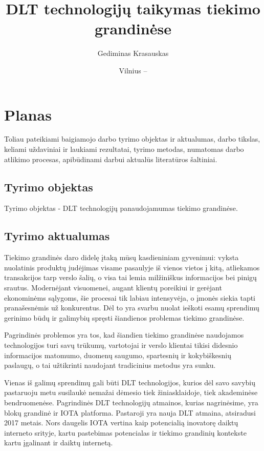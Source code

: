 \documentclass{VUMIFPSkursinis}
\title{DLT technologijų taikymas tiekimo grandinėse}
\author{Gediminas Krasauskas}
\date{Vilnius – \the\year}
\begin{document}
\maketitle

\section{Planas}

Toliau pateikiami baigiamojo darbo tyrimo objektas ir aktualumas, darbo tikslas, keliami uždaviniai ir laukiami rezultatai, tyrimo metodas, numatomas darbo atlikimo procesas, apibūdinami darbui aktualūs literatūros šaltiniai.

\subsection{Tyrimo objektas}

Tyrimo objektas - DLT technologijų panaudojamumas tiekimo grandinėse.

\subsection{Tyrimo aktualumas}

Tiekimo grandinės daro didelę įtaką mūsų kasdieniniam gyvenimui: vyksta nuolatinis produktų judėjimas visame pasaulyje iš vienos vietos į kitą, atliekamos transakcijos tarp verslo šalių, o visa tai lemia milžiniškus informacijos bei pinigų srautus. 
Modernėjant visuomenei, augant klientų poreikiui ir gerėjant ekonominėms sąlygoms, šie procesai tik labiau intensyvėja, o įmonės siekia tapti pranašesnėmis už konkurentus.
Dėl to yra svarbu nuolat ieškoti esamų sprendimų gerinimo būdų ir galimybių spręsti šiandienos problemas tiekimo grandinėse.

Pagrindinės problemos yra tos, kad šiandien tiekimo grandinėse naudojamos technologijos turi savų trūkumų, vartotojai ir verslo klientai tikisi didesnio informacijos matomumo, duomenų saugumo, spartesnių ir kokybiškesnių paslaugų, o tai užtikrinti naudojant tradicinius metodus yra sunku.

Vienas iš galimų sprendimų gali būti DLT technologijos, kurios dėl savo savybių pastaruoju metu susilaukė nemažai dėmesio tiek žiniasklaidoje, tiek akademinėse bendruomenėse. Pagrindinės DLT technologijų atmainos, kurias nagrinėsime, yra blokų grandinė ir IOTA platforma. Pastaroji yra nauja DLT atmaina, atsiradusi 2017 metais. Nors daugelis IOTA vertina kaip potencialią inovatorę daiktų interneto srityje, kartu pastebimas potencialas ir tiekimo grandinių kontekste kartu įgalinant ir daiktų internetą.
\end{document}
